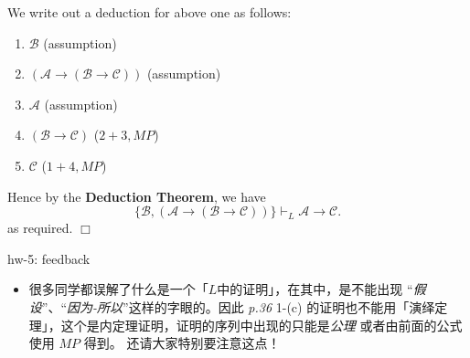 \documentclass[UTF8,12pt,a4paper]{ctexart}
\begin{document}
We write out a deduction for above one as follows:

\begin{enumerate}
	\item $\mathscr{B}$  
	\hfill (assumption)
	
	\item $(\mathscr{A} \to (\mathscr{B} \to \mathscr{C}))$
	\hfill (assumption)
	
	\item $\mathscr{A}$
	\hfill (assumption)
	
	\item $(\mathscr{B} \to \mathscr{C})$
	\hfill ($2+3,MP$)
	
	\item $\mathscr{C}$
	\hfill ($1+4, MP$)
\end{enumerate} 

Hence by the \textbf{Deduction Theorem}, we have
\[
\{\mathscr{B}, (\mathscr{A} \to (\mathscr{B} \to \mathscr{C}))\} \vdash_L \mathscr{A} \to \mathscr{C}.
\]
as required.
\hfill $\Box$

\vspace{1em}

\dotfill hw-5: feedback
\dotfill

\begin{itemize}
	\item  很多同学都误解了什么是一个「$L$中的证明」，在其中，是不能出现 “\textit{假设}”、“\textit{因为-所以}”这样的字眼的。因此
	\textit{p.36} 1-(c) 的证明也不能用「演绎定理」，这个是内定理证明，证明的序列中出现的只能是\textit{公理} 或者由前面的公式使用 $MP$ 得到。  还请大家特别要注意这点！
\end{itemize}
\end{document}
